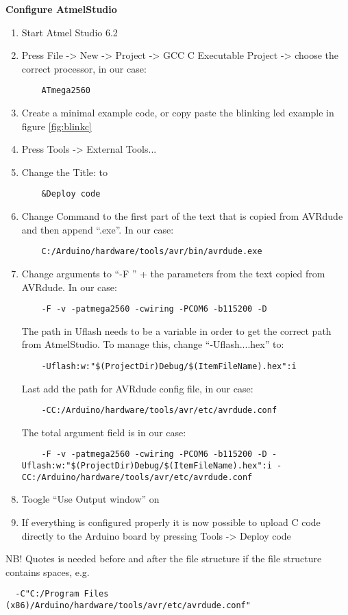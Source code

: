 \textbf{Configure AtmelStudio}
\begin{enumerate}
    \item Start Atmel Studio 6.2
    \item Press File -> New -> Project -> GCC C Executable Project -> choose the correct processor, in our case:
    \begin{lstlisting}
    ATmega2560
    \end{lstlisting}
    \item Create a minimal example code, or copy paste the blinking led example in figure \ref{fig:blinkc}
    \item Press Tools -> External Tools...
    \item Change the Title: to 
    \begin{lstlisting}
    &Deploy code
    \end{lstlisting}
    \item Change Command to the first part of the text that is copied from AVRdude and then append ``.exe''. In our case:
    \begin{lstlisting}
    C:/Arduino/hardware/tools/avr/bin/avrdude.exe
    \end{lstlisting}
    \item Change arguments to ``-F '' + the parameters from the text copied from AVRdude. In our case:
    \begin{lstlisting}
    -F -v -patmega2560 -cwiring -PCOM6 -b115200 -D 
    \end{lstlisting}
    The path in Uflash needs to be a variable in order to get the correct path from AtmelStudio. To manage this, change ``-Uflash....hex'' to:
    \begin{lstlisting}
    -Uflash:w:"$(ProjectDir)Debug/$(ItemFileName).hex":i
    \end{lstlisting}
    Last add the path for AVRdude config file, in our case:
    \begin{lstlisting}
    -CC:/Arduino/hardware/tools/avr/etc/avrdude.conf
    \end{lstlisting}
    
    
    The total argument field is in our case:
    \begin{lstlisting}
    -F -v -patmega2560 -cwiring -PCOM6 -b115200 -D -Uflash:w:"$(ProjectDir)Debug/$(ItemFileName).hex":i -CC:/Arduino/hardware/tools/avr/etc/avrdude.conf
    \end{lstlisting}
    
    \item Toogle ``Use Output window'' on
    \item If everything is configured properly it is now possible to upload C code directly to the Arduino board by pressing Tools -> Deploy code
\end{enumerate}
NB! Quotes is needed before and after the file structure if the file structure contains spaces, e.g.
\begin{lstlisting}
  -C"C:/Program Files (x86)/Arduino/hardware/tools/avr/etc/avrdude.conf"
\end{lstlisting}


